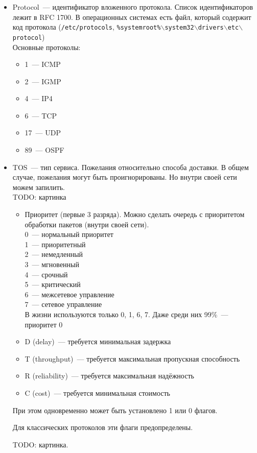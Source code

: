 \begin{itemize}
    \item Protocol~--- идентификатор вложенного протокола. Список идентификаторов лежит в RFC 1700. В операционных системах есть файл, который содержит код протокола ({\tt /etc/protocols}, {\tt \%systemroot\%$\backslash$system32$\backslash$drivers$\backslash$etc$\backslash$protocol})\\
    Основные протоколы:
    \begin{itemize}
        \item 1~--- ICMP
        \item 2~--- IGMP
        \item 4~--- IP4
        \item 6~--- TCP
        \item 17~--- UDP
        \item 89~--- OSPF
    \end{itemize}
    \item TOS~--- тип сервиса. Пожелания относительно способа доставки. В общем случае, пожелания могут быть проигнорированы. Но внутри своей сети можем запилить.\\
    TODO: картинка\\
    \begin{itemize}
        \item Приоритет (первые 3 разряда). Можно сделать очередь с приоритетом обработки пакетов (внутри своей сети).\\
        0~--- нормальный приоритет\\
        1~--- приоритетный\\
        2~--- немедленный\\
        3~--- мгновенный\\
        4~--- срочный\\
        5~--- критический\\
        6~--- межсетевое управление\\ 
        7~--- сетевое управление\\

        В жизни используются только 0, 1, 6, 7. Даже среди них 99\%~--- приоритет 0

        \item D (delay)~--- требуется минимальная задержка
        \item T (throughput)~--- требуется максимальная пропускная способность
        \item R (reliability)~--- требуется максимальная надёжность
        \item C (cost)~--- требуется минимальная стоимость
    \end{itemize}

    При этом одновременно может быть установлено 1 или 0 флагов.

    Для классических протоколов эти флаги предопределены.

    TODO: картинка.
\end{itemize}

